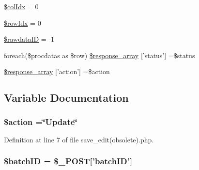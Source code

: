 \begin{DoxyCompactItemize}
\item 
\hyperlink{processing_2obsolete_2save__edit_07obsolete_08_8php_a2efb2f950a559a8fda8c5b114c5ea10f}{\$col\-Idx} = 0
\item 
\hyperlink{processing_2obsolete_2save__edit_07obsolete_08_8php_a2457f3fab8183bd163626612df265a7e}{\$row\-Idx} = 0
\item 
\hyperlink{processing_2obsolete_2save__edit_07obsolete_08_8php_a7e1df84a3733bb1672c8485fa286658d}{\$rawdata\-I\-D} = -\/1
\item 
foreach(\$procdatas as \$row) \hyperlink{processing_2obsolete_2save__edit_07obsolete_08_8php_a7a23fc905184e8d9769c6c2948032a18}{\$response\-\_\-array} \mbox{[}'status'\mbox{]} =\$status
\item 
\hyperlink{processing_2obsolete_2save__edit_07obsolete_08_8php_ae768978a0cdc416c0d63d798c85c8784}{\$response\-\_\-array} \mbox{[}'action'\mbox{]} =\$action
\end{DoxyCompactItemize}


\subsection{Variable Documentation}
\hypertarget{processing_2obsolete_2save__edit_07obsolete_08_8php_aa698a3e72116e8e778be0e95d908ee30}{
\subsubsection[{\$action}]{\setlength{\rightskip}{0pt plus 5cm}\$action =\char`\"{}Update\char`\"{}}}\label{processing_2obsolete_2save__edit_07obsolete_08_8php_aa698a3e72116e8e778be0e95d908ee30}


Definition at line 7 of file save\-\_\-edit(obsolete).\-php.

\hypertarget{processing_2obsolete_2save__edit_07obsolete_08_8php_aaa6d122ea9cb55b210aadd86e5654a74}{
\subsubsection[{\$batch\-I\-D}]{\setlength{\rightskip}{0pt plus 5cm}\${\bf batch\-I\-D} = \$\-\_\-\-P\-O\-S\-T\mbox{[}'{\bf batch\-I\-D}'\mbox{]}}}\label{processing_2obsolete_2save__edit_07obsolete_08_8php_aaa6d122ea9cb55b210aadd86e5654a74}


